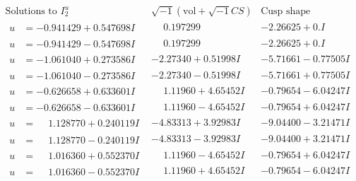 \documentclass[1p]{elsarticle_modified}
\theoremstyle{definition}
\newcommand{\I}{\sqrt{-1}}
\begin{document}
$$\begin{array}{c|c|c}  
\text{Solutions to }I^u_{2}& \I (\text{vol} + \sqrt{-1}CS) & \text{Cusp shape}\\
 \hline 
\begin{aligned}
u &= -0.941429 + 0.547698 I\end{aligned}
 & \phantom{-}0.197299\phantom{ +0.000000I} & -2.26625 + 0. I\phantom{ +0.000000I} \\ \hline\begin{aligned}
u &= -0.941429 - 0.547698 I\end{aligned}
 & \phantom{-}0.197299\phantom{ +0.000000I} & -2.26625 + 0. I\phantom{ +0.000000I} \\ \hline\begin{aligned}
u &= -1.061040 + 0.273586 I\end{aligned}
 & -2.27340 + 0.51998 I & -5.71661 - 0.77505 I \\ \hline\begin{aligned}
u &= -1.061040 - 0.273586 I\end{aligned}
 & -2.27340 - 0.51998 I & -5.71661 + 0.77505 I \\ \hline\begin{aligned}
u &= -0.626658 + 0.633601 I\end{aligned}
 & \phantom{-}1.11960 + 4.65452 I & -0.79654 - 6.04247 I \\ \hline\begin{aligned}
u &= -0.626658 - 0.633601 I\end{aligned}
 & \phantom{-}1.11960 - 4.65452 I & -0.79654 + 6.04247 I \\ \hline\begin{aligned}
u &= \phantom{-}1.128770 + 0.240119 I\end{aligned}
 & -4.83313 + 3.92983 I & -9.04400 - 3.21471 I \\ \hline\begin{aligned}
u &= \phantom{-}1.128770 - 0.240119 I\end{aligned}
 & -4.83313 - 3.92983 I & -9.04400 + 3.21471 I \\ \hline\begin{aligned}
u &= \phantom{-}1.016360 + 0.552370 I\end{aligned}
 & \phantom{-}1.11960 - 4.65452 I & -0.79654 + 6.04247 I \\ \hline\begin{aligned}
u &= \phantom{-}1.016360 - 0.552370 I\end{aligned}
 & \phantom{-}1.11960 + 4.65452 I & -0.79654 - 6.04247 I \\ \hline\begin{aligned}

\end{aligned}
\end{array}$$
\end{document}
